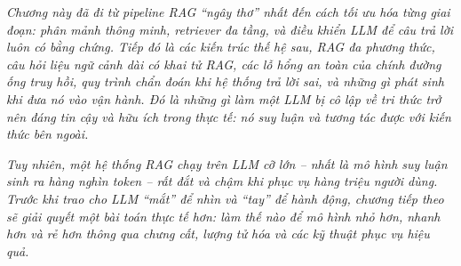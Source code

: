 \textit{Chương này đã đi từ pipeline RAG “ngây thơ” nhất đến cách tối ưu hóa từng giai đoạn: phân mảnh thông minh, retriever đa tầng, và điều khiển LLM để câu trả lời luôn có bằng chứng. Tiếp đó là các kiến trúc thế hệ sau, RAG đa phương thức, câu hỏi liệu ngữ cảnh dài có khai tử RAG, các lỗ hổng an toàn của chính đường ống truy hồi, quy trình chẩn đoán khi hệ thống trả lời sai, và những gì phát sinh khi đưa nó vào vận hành. Đó là những gì làm một LLM bị cô lập về tri thức trở nên đáng tin cậy và hữu ích trong thực tế: nó suy luận và tương tác được với kiến thức bên ngoài.}

\textit{Tuy nhiên, một hệ thống RAG chạy trên LLM cỡ lớn -- nhất là mô hình suy luận sinh ra hàng nghìn token -- rất đắt và chậm khi phục vụ hàng triệu người dùng. Trước khi trao cho LLM “mắt” để nhìn và “tay” để hành động, chương tiếp theo sẽ giải quyết một bài toán thực tế hơn: làm thế nào để mô hình nhỏ hơn, nhanh hơn và rẻ hơn thông qua chưng cất, lượng tử hóa và các kỹ thuật phục vụ hiệu quả.}
